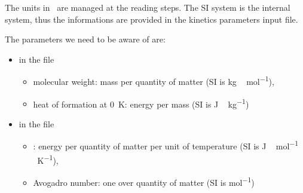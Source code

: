 The units in \Antioch\ are managed at the reading
steps. The SI system is the internal system, thus
the informations are provided in the kinetics parameters 
input file.

The parameters we need to be aware of are:
\begin{itemize}
\item in the file 
        \begin{itemize}
        \item molecular weight: mass per quantity of matter (SI is \unit{kg\,mol^{-1}}),
        \item heat of formation at 0~\unit{K}: energy per mass (SI is \unit{J\,kg^{-1}})
        \end{itemize}
\item in the file 
        \begin{itemize}
        \item \Rg: energy per quantity of matter per unit of temperature (SI is \unit{J\,mol^{-1}\,K^{-1}}),
        \item Avogadro number: one over quantity of matter (SI is \unit{mol^{-1}})
        \end{itemize}
\end{itemize}

